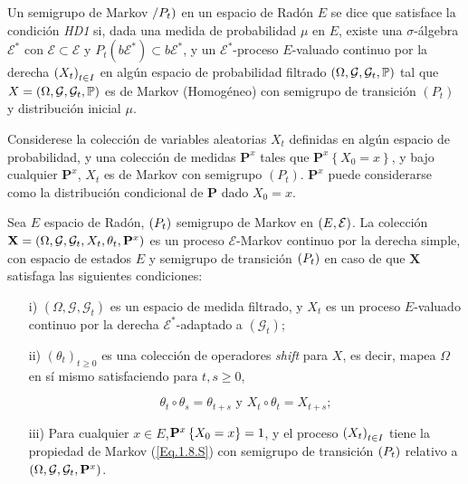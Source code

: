 \begin{Def}[HD1]\label{Eq.2.1.S}
Un semigrupo de Markov $\left/P_{t}\right)$ en un espacio de Rad\'on $E$ se dice que satisface la condici\'on {\em HD1} si, dada una medida de probabilidad $\mu$ en $E$, existe una $\sigma$-\'algebra $\mathcal{E^{*}}$ con $\mathcal{E}\subset\mathcal{E}$ y $P_{t}\left(b\mathcal{E}^{*}\right)\subset b\mathcal{E}^{*}$, y un $\mathcal{E}^{*}$-proceso $E$-valuado continuo por la derecha $\left(X_{t}\right)_{t\in I}$ en alg\'un espacio de probabilidad filtrado $\left(\Omega,\mathcal{G},\mathcal{G}_{t},\mathbb{P}\right)$ tal que $X=\left(\Omega,\mathcal{G},\mathcal{G}_{t},\mathbb{P}\right)$ es de Markov (Homog\'eneo) con semigrupo de transici\'on $(P_{t})$ y distribuci\'on inicial $\mu$.
\end{Def}

Considerese la colecci\'on de variables aleatorias $X_{t}$ definidas en alg\'un espacio de probabilidad, y una colecci\'on de medidas $\mathbf{P}^{x}$ tales que $\mathbf{P}^{x}\left\{X_{0}=x\right\}$, y bajo cualquier $\mathbf{P}^{x}$, $X_{t}$ es de Markov con semigrupo $\left(P_{t}\right)$. $\mathbf{P}^{x}$ puede considerarse como la distribuci\'on condicional de $\mathbf{P}$ dado $X_{0}=x$.

\begin{Def}\label{Def.2.2.S}
Sea $E$ espacio de Rad\'on, $\left(P_{t}\right)$ semigrupo de Markov en $\left(E,\mathcal{E}\right)$. La colecci\'on $\mathbf{X}=\left(\Omega,\mathcal{G},\mathcal{G}_{t},X_{t},\theta_{t},\mathbf{P}^{x}\right)$ es un proceso $\mathcal{E}$-Markov continuo por la derecha simple, con espacio de estados $E$ y semigrupo de transici\'on $\left(P_{t}\right)$ en caso de que $\mathbf{X}$ satisfaga las siguientes condiciones:
\begin{itemize}
\item[i)] $\left(\Omega,\mathcal{G},\mathcal{G}_{t}\right)$ es un espacio de medida filtrado, y $X_{t}$ es un proceso $E$-valuado continuo por la derecha $\mathcal{E}^{*}$-adaptado a $\left(\mathcal{G}_{t}\right)$;

\item[ii)] $\left(\theta_{t}\right)_{t\geq0}$ es una colecci\'on de operadores {\em shift} para $X$, es decir, mapea $\Omega$ en s\'i mismo satisfaciendo para $t,s\geq0$,

\begin{equation}\label{Eq.Shift}
\theta_{t}\circ\theta_{s}=\theta_{t+s}\textrm{ y }X_{t}\circ\theta_{t}=X_{t+s};
\end{equation}

\item[iii)] Para cualquier $x\in E$,$\mathbf{P}^{x}\left\{X_{0}=x\right\}=1$, y el proceso $\left(X_{t}\right)_{t\in I}$ tiene la propiedad de Markov (\ref{Eq.1.8.S}) con semigrupo de transici\'on $\left(P_{t}\right)$ relativo a $\left(\Omega,\mathcal{G},\mathcal{G}_{t},\mathbf{P}^{x}\right)$.
\end{itemize}
\end{Def}

